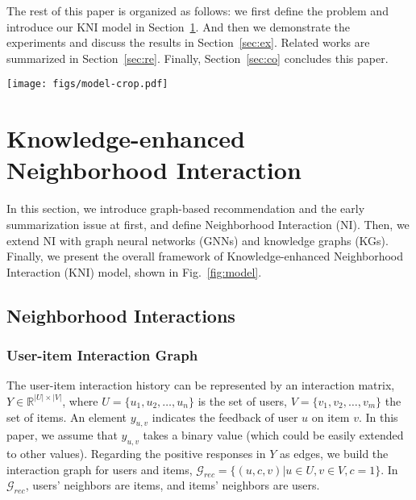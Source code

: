 \documentclass[sigconf]{acmart}
\newcommand{\mG}{\mathcal{G}}
\newcommand{\bbR}{\mathbb{R}}
\newcommand{\new}[1]{{\color{black} #1}}
\begin{document}
The rest of this paper is organized as follows: we first define the problem and introduce our KNI model in Section~\ref{sec:me}. And then we demonstrate the experiments and discuss the results in Section~\ref{sec:ex}. Related works are summarized in Section~\ref{sec:re}. Finally, Section~\ref{sec:co} concludes this paper.

\begin{figure*}
    \centering
    \texttt{[image: figs/model-crop.pdf]}
    \caption{Model overview. \emph{Note}: Red circles denote users. Green circles denote rated or unseen items. Blue circles denote non-item entities. Dash circles denote user and item neighborhoods. In this example, a KIG is constructed at first, and then higher hop neighborhood information is aggregated into local neighbors. Finally, the user and item neighborhoods are collected to compute neighborhood interactions.} \label{fig:model}
\end{figure*}

\section{Knowledge-enhanced Neighborhood Interaction} \label{sec:me}
\new{In this section, we introduce graph-based recommendation and the early summarization issue at first, and define Neighborhood Interaction (NI). Then, we extend NI with graph neural networks (GNNs) and knowledge graphs (KGs). Finally, we present the overall framework of Knowledge-enhanced Neighborhood Interaction (KNI) model, shown in Fig.~\ref{fig:model}.}

\subsection{Neighborhood Interactions}\label{sec:ni}



\subsubsection{User-item Interaction Graph} The user-item interaction history can be represented by an interaction matrix, $Y \in \bbR^{|U| \times |V|}$, where $U = \{u_1, u_2, \dots, u_n\}$ is the set of users, $V = \{v_1, v_2, \dots, v_m\}$ the set of items.
An element $y_{u,v}$ indicates the feedback of user $u$ on item $v$. In this paper,
we assume that $y_{u,v}$ takes a binary value (which could be easily extended to other values). 
Regarding the positive responses in $Y$ as edges, we build the interaction graph for users and items, $\mG_{rec} = \{(u,c,v)|u \in U, v \in V, c = 1\}$. In $\mG_{rec}$, users' neighbors are items, and items' neighbors are users. 
\end{document}
